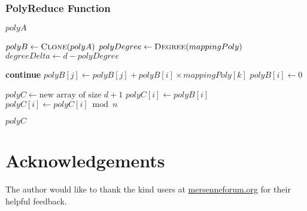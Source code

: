 \documentclass{article}
\theoremstyle{plain}
\theoremstyle{definition}
\begin{document}
\subsubsection{PolyReduce Function}
\begin{algorithmic}
        \State \Return $polyA$
    \EndIf

    \State $polyB \gets \Call{Clone}{polyA}$ 
    \State $polyDegree \gets \Call{Degree}{mappingPoly}$ 
    \State $degreeDelta \gets d - polyDegree$

            \State \textbf{continue}
        \EndIf
            \State $polyB[j] \gets polyB[j] + polyB[i] \times mappingPoly[k]$ 
        \EndFor
        \State $polyB[i] \gets 0$
    \EndFor

    \State $polyC \gets \text{new array of size } d + 1$
      
        \State $polyC[i] \gets polyB[i]$
            \State $polyC[i] \gets polyC[i] \bmod n$
        \EndIf
    \EndFor

    \State \Return $polyC$
\EndFunction
\end{algorithmic}

\section{Acknowledgements}
The author would like to thank the kind users at \url{mersenneforum.org} for their helpful feedback.

\begingroup
\raggedright


\endgroup
\end{document}
